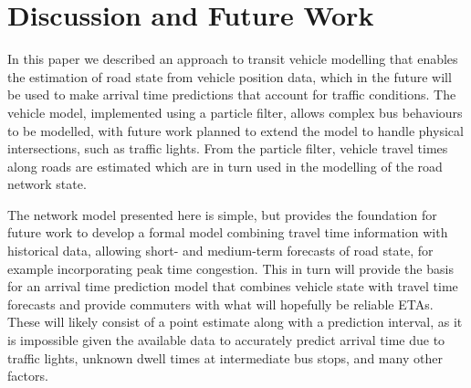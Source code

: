 \section{Discussion and Future Work}
\label{sec:discussion}

In this paper we described an approach to transit vehicle modelling
that enables the \rt estimation of road state from vehicle position data,
which in the future will be used to make arrival time predictions
that account for \rt traffic conditions.
The vehicle model, implemented using a particle filter,
allows complex bus behaviours to be modelled,
with future work planned to extend the model to handle physical intersections,
such as traffic lights.
From the particle filter,
vehicle travel times along roads are estimated which are in turn used 
in the modelling of the road network state.


The network model presented here is simple,
but provides the foundation for future work to
develop a formal model combining \rt travel time information with historical data, 
allowing short- and medium-term forecasts of road state,
for example incorporating peak time congestion.
This in turn will provide the basis for an arrival time prediction model
that combines \rt vehicle state with travel time forecasts
and provide commuters with what will hopefully be reliable ETAs.
These will likely consist of a point estimate along with a prediction interval,
as it is impossible given the available data to accurately predict arrival time
due to traffic lights, unknown dwell times at intermediate bus stops,
and many other factors.








